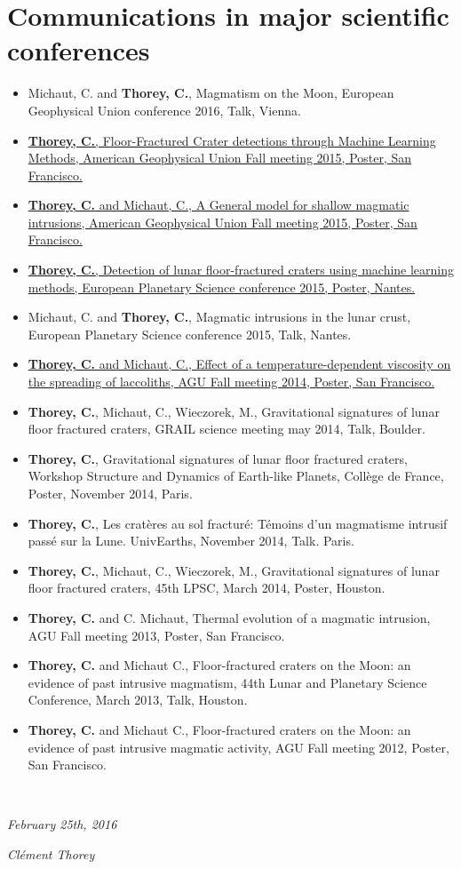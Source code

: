 \documentclass[]{friggeri-cv}
\begin{document}
\section{Communications in major scientific conferences}
\begin{itemize}
\item Michaut, C. and \textbf{Thorey, C.}, Magmatism on the Moon,
 European Geophysical Union conference 2016, Talk, Vienna.
\item
  \href{https://agu.confex.com/agu/fm15/meetingapp.cgi/Paper/67077}{\textbf{Thorey, C.},
    Floor-Fractured Crater detections through
 Machine Learning Methods, American Geophysical Union Fall meeting
 2015, Poster, San Francisco.}
\item
  \href{https://agu.confex.com/agu/fm15/meetingapp.cgi/Paper/67089}{\textbf{Thorey,
      C.} and Michaut, C., A General model for shallow magmatic intrusions, American Geophysical Union Fall meeting 2015,
 Poster, San Francisco.}
\item \href{http://meetingorganizer.copernicus.org/EPSC2015/EPSC2015-95.pdf}{\textbf{Thorey, C.}, Detection of lunar floor-fractured craters
 using machine learning methods, European Planetary Science
 conference 2015, Poster, Nantes.}
\item Michaut, C. and \textbf{Thorey, C.}, Magmatic intrusions in the
 lunar crust, European Planetary Science conference 2015, Talk,
 Nantes.
\item \href{https://agu.confex.com/agu/fm14/meetingapp.cgi/Paper/6420}{\textbf{Thorey, C.} and Michaut, C., Effect of a temperature-dependent
 viscosity on the spreading of laccoliths, AGU Fall meeting 2014,
 Poster, San Francisco.}
\item \textbf{Thorey, C.}, Michaut, C., Wieczorek, M., Gravitational signatures
 of lunar floor fractured craters, GRAIL science meeting may 2014,
 Talk, Boulder.
\item \textbf{Thorey, C.}, Gravitational signatures of lunar floor
 fractured craters, Workshop Structure and Dynamics of Earth-like
 Planets, Collège de France, Poster, November 2014, Paris.
\item \textbf{Thorey, C.}, Les cratères au sol fracturé: Témoins
 d'un magmatisme intrusif passé sur la Lune. UnivEarths, November
 2014, Talk. Paris.
\item \textbf{Thorey, C.}, Michaut, C., Wieczorek, M., Gravitational
 signatures of lunar floor fractured craters, 45th LPSC, March 2014,
 Poster, Houston.
\item \textbf{Thorey, C.} and C. Michaut, Thermal evolution of a magmatic
 intrusion, AGU Fall meeting 2013, Poster, San Francisco.
\item \textbf{Thorey, C.} and Michaut C., Floor-fractured craters on the Moon:
 an evidence of past intrusive magmatism, 44th Lunar and Planetary
 Science Conference, March 2013, Talk, Houston.
\item \textbf{Thorey, C.} and Michaut C., Floor-fractured craters on the Moon:
 an evidence of past intrusive magmatic activity, AGU Fall meeting
 2012, Poster, San Francisco.
\end{itemize}
~
~

\begin{flushleft}
\emph{February 25th, 2016}
\end{flushleft}
\begin{flushright}
\emph{Clément Thorey}
\end{flushright}
\end{document}
